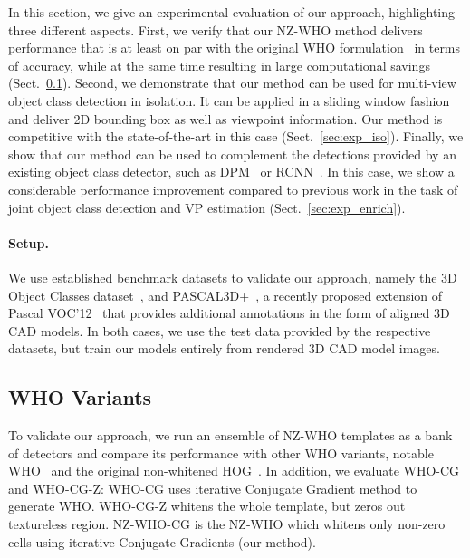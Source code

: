 %
In this section, we give an experimental evaluation of our approach,
highlighting three different aspects.
%
First, we verify that our NZ-WHO method delivers performance that is
at least on par with the original WHO formulation~\cite{Hariharan12} in terms of
accuracy, while at the same time resulting in large computational
savings (Sect.~\ref{sec:variations}).
%
Second, we demonstrate that our method can be used for multi-view
object class detection in isolation. It can be applied in a sliding
window fashion and deliver 2D bounding box as well as viewpoint
information. Our method is competitive with the state-of-the-art in this
case (Sect.~\ref{sec:exp_iso}).
%
Finally, we show that our method can be used to complement the
detections provided by an existing object class detector, such
as DPM~\cite{Felzenszwalb10} or RCNN~\cite{Girshick14}. In this case,
we show a considerable performance improvement compared to previous
work in the task of joint object class detection and VP
estimation (Sect.~\ref{sec:exp_enrich}).

\paragraph{Setup.}
We use established benchmark datasets to validate our approach, namely
the 3D Object Classes dataset~\cite{Savarese07}, and
PASCAL3D+~\cite{Xiang14}, a recently proposed extension of Pascal
VOC'12~\cite{pascal12} that provides additional annotations in the
form of aligned 3D CAD models. In both cases, we use the test data
provided by the respective datasets, but train our models entirely
from rendered 3D CAD model images.

%

\subsection{WHO Variants}
\label{sec:variations}
To validate our approach, we run an ensemble of NZ-WHO templates as a
bank of detectors and compare its performance with other WHO
variants, notable WHO~\cite{Hariharan12} and the original non-whitened
HOG~\cite{Dalal05}. In addition, we evaluate WHO-CG and WHO-CG-Z:
WHO-CG uses iterative Conjugate Gradient method to generate
WHO. WHO-CG-Z whitens the whole template, but zeros out textureless
region. NZ-WHO-CG is the NZ-WHO which whitens only non-zero cells using
iterative Conjugate Gradients  (our method).

